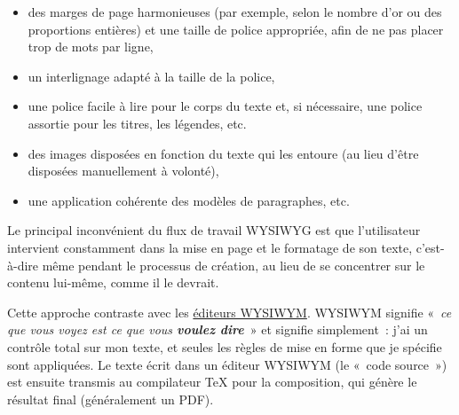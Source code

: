 \documentclass[11pt,a4paper,ngerman,french,DIV=8]{scrartcl}
\begin{document}
\begin{itemize}
  \item des marges de page harmonieuses (par exemple, selon le nombre d'or ou des proportions entières) et une taille de police appropriée, afin de ne pas placer trop de mots par ligne,
  \item un interlignage adapté à la taille de la police,
  \item une police facile à lire pour le corps du texte et, si nécessaire, une police assortie pour les titres, les légendes, etc.
  \item des images disposées en fonction du texte qui les entoure (au lieu d'être disposées manuellement à volonté),
  \item une application cohérente des modèles de paragraphes, etc.
\end{itemize}
Le principal inconvénient du flux de travail WYSIWYG est que l'utilisateur intervient constamment dans la mise en page et le formatage de son texte, c'est-à-dire même pendant le processus de création, au lieu de se concentrer sur le contenu lui-même, comme il le devrait.

Cette approche contraste avec les \href{https://www.teuderun.de/latex/editor/\%C3\%BCbersicht/}{éditeurs WYSIWYM}. WYSIWYM signifie « \emph{ce que vous voyez est ce que vous \textbf{voulez dire}} » et signifie simplement : j’ai un contrôle total sur mon texte, et seules les règles de mise en forme que je spécifie sont appliquées. Le texte écrit dans un éditeur WYSIWYM (le « code source ») est ensuite transmis au compilateur \TeX{} pour la composition, qui génère le résultat final (généralement un PDF).
\end{document}
